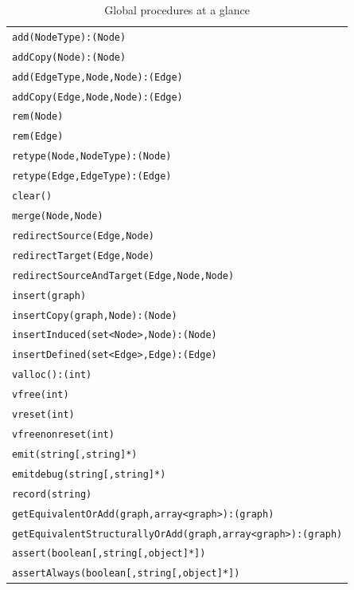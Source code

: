 \begin{table}[htbp]
\centering
\begin{tabular}{|l|}
\hline
\texttt{add(NodeType):(Node)}\\
\texttt{addCopy(Node):(Node)}\\
\texttt{add(EdgeType,Node,Node):(Edge)}\\
\texttt{addCopy(Edge,Node,Node):(Edge)}\\
\texttt{rem(Node)}\\
\texttt{rem(Edge)}\\
\texttt{retype(Node,NodeType):(Node)}\\
\texttt{retype(Edge,EdgeType):(Edge)}\\
\texttt{clear()}\\
\hline
\texttt{merge(Node,Node)}\\
\texttt{redirectSource(Edge,Node)}\\
\texttt{redirectTarget(Edge,Node)}\\
\texttt{redirectSourceAndTarget(Edge,Node,Node)}\\
\hline
\texttt{insert(graph)}\\
\texttt{insertCopy(graph,Node):(Node)}\\
\texttt{insertInduced(set<Node>,Node):(Node)}\\
\texttt{insertDefined(set<Edge>,Edge):(Edge)}\\
\hline
\texttt{valloc():(int)}\\
\texttt{vfree(int)}\\
\texttt{vreset(int)}\\
\texttt{vfreenonreset(int)}\\
\hline
\texttt{emit(string[,string]*)}\\
\texttt{emitdebug(string[,string]*)}\\
\texttt{record(string)}\\
\hline
\texttt{getEquivalentOrAdd(graph,array<graph>):(graph)}\\
\texttt{getEquivalentStructurallyOrAdd(graph,array<graph>):(graph)}\\
\hline
\texttt{assert(boolean[,string[,object]*])}\\
\texttt{assertAlways(boolean[,string[,object]*])}\\
\hline
\end{tabular}
\caption{Global procedures at a glance}
\label{procstab}
\end{table}

